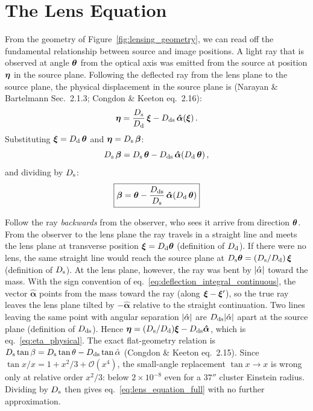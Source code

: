 \section{The Lens Equation}
\label{sec:lens_equation}

From the geometry of Figure~\ref{fig:lensing_geometry}, we can read off
the fundamental relationship between source and image positions.  A light
ray that is observed at angle $\boldsymbol{\theta}$ from the optical axis was
emitted from the source at position $\boldsymbol{\eta}$ in the source plane.
Following the deflected ray from the lens plane to the source plane, the
physical displacement in the source plane is
(Narayan \& Bartelmann Sec.~2.1.3; Congdon \& Keeton eq.~2.16):
\begin{equation}
    \boldsymbol{\eta} = \frac{D_{\mathrm{s}}}{D_{\mathrm{d}}}\, \boldsymbol{\xi}
    - D_{\mathrm{ds}}\, \boldsymbol{\hat{\alpha}}(\boldsymbol{\xi}) \,.
    \label{eq:eta_physical}
\end{equation}
Substituting $\boldsymbol{\xi} = D_{\mathrm{d}}\,\boldsymbol{\theta}$ and
$\boldsymbol{\eta} = D_{\mathrm{s}}\,\boldsymbol{\beta}$:
\begin{equation}
    D_{\mathrm{s}}\, \boldsymbol{\beta} = D_{\mathrm{s}}\, \boldsymbol{\theta}
    - D_{\mathrm{ds}}\, \boldsymbol{\hat{\alpha}}(D_{\mathrm{d}}\,\boldsymbol{\theta}) \,,
\end{equation}
and dividing by $D_{\mathrm{s}}$:
\begin{equation}
    \boxed{
    \boldsymbol{\beta} = \boldsymbol{\theta}
    - \frac{D_{\mathrm{ds}}}{D_{\mathrm{s}}}\, \boldsymbol{\hat{\alpha}}(D_{\mathrm{d}}\,\boldsymbol{\theta})
    }
    \label{eq:lens_equation_full}
\end{equation}
\begin{derivation}
Follow the ray \emph{backwards} from the observer, who sees it arrive from
direction $\boldsymbol{\theta}$.  From the observer to the lens plane the ray travels
in a straight line and meets the lens plane at transverse position
$\boldsymbol{\xi} = D_{\mathrm{d}}\boldsymbol{\theta}$ (definition of $D_{\mathrm{d}}$).  If there were no lens, the
same straight line would reach the source plane at
$D_{\mathrm{s}}\boldsymbol{\theta} = (D_{\mathrm{s}}/D_{\mathrm{d}})\,\boldsymbol{\xi}$ (definition of $D_{\mathrm{s}}$).  At the lens
plane, however, the ray was bent by $|\hat{\alpha}|$ toward the mass.  With
the sign convention of eq.~\eqref{eq:deflection_integral_continuous}, the
vector $\boldsymbol{\hat{\alpha}}$ points from the mass toward the ray
(along $\boldsymbol{\xi} - \boldsymbol{\xi}'$), so the true ray leaves the lens plane tilted
by $-\boldsymbol{\hat{\alpha}}$ relative to the straight continuation.
Two lines leaving the same point with angular separation $|\hat{\alpha}|$
are $D_{\mathrm{ds}}|\hat{\alpha}|$ apart at the source plane (definition of $D_{\mathrm{ds}}$).
Hence $\boldsymbol{\eta} = (D_{\mathrm{s}}/D_{\mathrm{d}})\boldsymbol{\xi} - D_{\mathrm{ds}}\boldsymbol{\hat{\alpha}}$, which is
eq.~\eqref{eq:eta_physical}.
The exact flat-geometry relation is
$D_{\mathrm{s}}\tan\beta = D_{\mathrm{s}}\tan\theta - D_{\mathrm{ds}}\tan\hat{\alpha}$ (Congdon \& Keeton
eq.~2.15). Since $\tan x / x = 1 + x^2/3 + \mathcal{O}(x^4)$, the
small-angle replacement $\tan x \to x$ is wrong only at relative order
$x^2/3$: below $2\times10^{-8}$ even for a $37''$ cluster Einstein radius.
Dividing by $D_{\mathrm{s}}$ then gives eq.~\eqref{eq:lens_equation_full} with no
further approximation.
\end{derivation}

